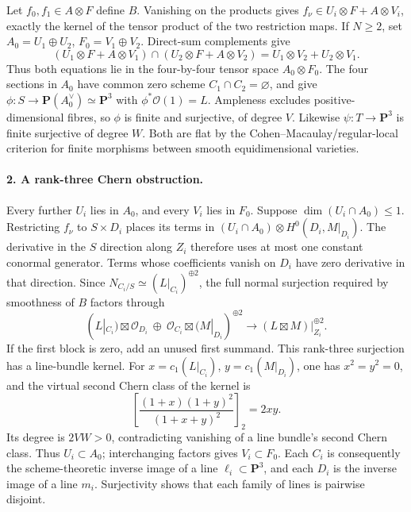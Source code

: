 \documentclass[11pt]{article}
\theoremstyle{remark}\newtheorem{remark}[theorem]{Remark}
\begin{document}
Let $f_0,f_1\in A\otimes F$ define $B$. Vanishing on the products
gives $f_\nu\in U_i\otimes F+A\otimes V_i$, exactly the kernel
of the tensor product of the two restriction maps.
If $N\ge2$, set $A_0=U_1\oplus U_2$, $F_0=V_1\oplus V_2$.
Direct-sum complements give
\[
 (U_1\otimes F+A\otimes V_1)\cap(U_2\otimes F+A\otimes V_2)
                         =U_1\otimes V_2+U_2\otimes V_1.     \tag{A11.3}
\]
Thus both equations lie in the four-by-four tensor space
$A_0\otimes F_0$.
The four sections in $A_0$ have common zero scheme
$C_1\cap C_2=\varnothing$, and give
$\phi:S\to\mathbf P(A_0^\vee)\simeq\mathbf P^3$ with
$\phi^*\mathcal O(1)=L$. Ampleness excludes positive-dimensional
fibres, so $\phi$ is finite and surjective, of degree $V$.
Likewise $\psi:T\to\mathbf P^3$ is finite surjective of degree
$W$. Both are flat by the Cohen--Macaulay/regular-local
criterion for finite morphisms between smooth equidimensional
varieties.

\paragraph{2. A rank-three Chern obstruction.}
Every further $U_i$ lies in $A_0$, and every $V_i$ lies in $F_0$.
Suppose $\dim(U_i\cap A_0)\le1$. Restricting $f_\nu$ to
$S\times D_i$ places its terms in
$(U_i\cap A_0)\otimes H^0(D_i,M|_{D_i})$.
The derivative in the $S$ direction along $Z_i$ therefore uses
at most one constant conormal generator. Terms whose coefficients
vanish on $D_i$ have zero derivative in that direction.
Since $N_{C_i/S}\simeq(L|_{C_i})^{\oplus2}$, the full normal
surjection required by smoothness of $B$ factors through
\[
 (L|_{C_i})\boxtimes\mathcal O_{D_i}\ \oplus\
 \mathcal O_{C_i}\boxtimes(M|_{D_i})^{\oplus2}
                 \longrightarrow (L\boxtimes M)|_{Z_i}^{\oplus2}.
                                                               \tag{A11.4}
\]
If the first block is zero, add an unused first summand.
This rank-three surjection has a line-bundle kernel.
For $x=c_1(L|_{C_i})$, $y=c_1(M|_{D_i})$, one has $x^2=y^2=0$,
and the virtual second Chern class of the kernel is
\[
                    \left[\frac{(1+x)(1+y)^2}{(1+x+y)^2}\right]_2
                           =2xy.
\]
Its degree is $2VW>0$, contradicting vanishing of a line bundle's
second Chern class. Thus $U_i\subset A_0$; interchanging factors
gives $V_i\subset F_0$.
Each $C_i$ is consequently the scheme-theoretic inverse image
of a line $\ell_i\subset\mathbf P^3$, and each $D_i$ is the
inverse image of a line $m_i$. Surjectivity shows that each
family of lines is pairwise disjoint.
\end{document}

